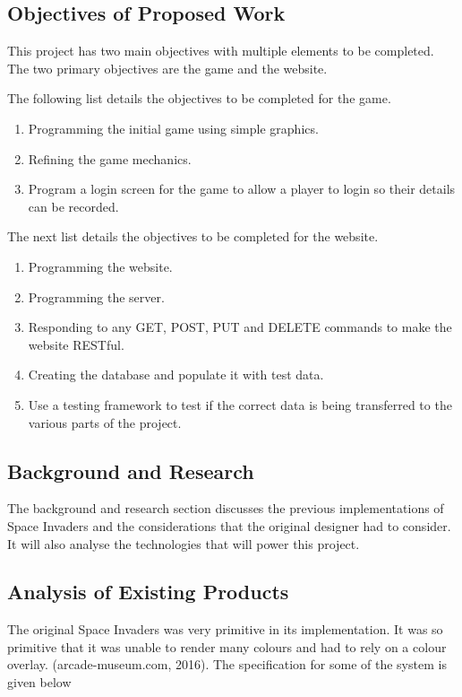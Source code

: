 \documentclass[12pt]{article}
\begin{document}
\begin{center}
\subsection{Objectives of Proposed Work}
\end{center}
This project has two main objectives with multiple elements to be completed. The two primary objectives are the game and the website. 

The following list details the objectives to be completed for the game.

\begin{enumerate}
\item Programming the initial game using simple graphics.
\item Refining the game mechanics.
\item Program a login screen for the game to allow a player to login so their details can
be recorded.
\end{enumerate}

The next list details the objectives to be completed for the website.

\begin{enumerate}
\item Programming the website.
\item Programming the server.
\item Responding to any GET, POST, PUT and DELETE commands to make the
website RESTful.
\item Creating the database and populate it with test data.
\item Use a testing framework to test if the correct data is being transferred to the
various parts of the project.
\end{enumerate}
\newpage

\begin{center}
\section{Background and Research}
\end{center}
The background and research section discusses the previous implementations of Space Invaders and the considerations that the original designer had to consider. It will also analyse the technologies that will power this project. 

\begin{center}
\subsection{Analysis of Existing Products}
\end{center}
The original Space Invaders was very primitive in its implementation. It was so primitive that it was unable to render many colours and had to rely on a colour overlay. (arcade-museum.com, 2016). The specification for some of the system is given below
\end{document}
